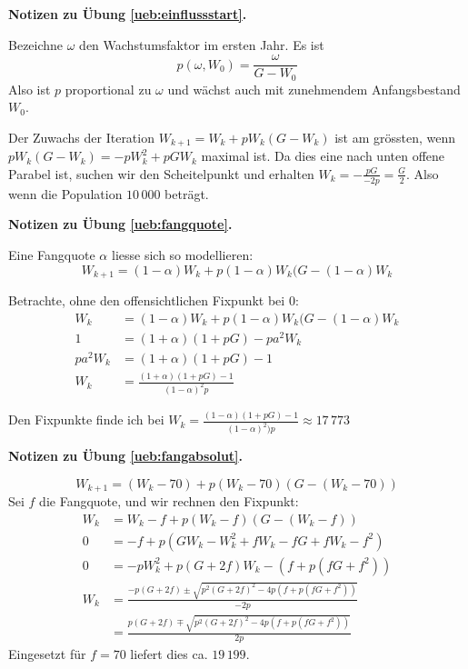 \documentclass[%
11pt,%
twoside,%
titlepage,%
german,%
headsepline%
]{scrartcl}
\newcommand{\concatueb}[1]{ueb:#1}%
\newcommand{\concatlsg}[1]{lsg:#1}%
\newenvironment{lsg}[1]{%
    \par\noindent\textbf{Notizen zu Übung \ref{\concatueb{#1}}.}%
    \label{\concatlsg{#1}}
}{%
    \par%
}
\begin{document}
\begin{lsg}{einflussstart}
    Bezeichne $\omega$ den Wachstumsfaktor im ersten Jahr. Es ist
    $$p(\omega,W_0)=\frac{\omega}{G-W_0}$$
    Also ist $p$ proportional zu $\omega$ und wächst auch mit zunehmendem Anfangsbestand $W_0$.

    Der Zuwachs der Iteration $W_{k+1} = W_k+pW_k(G-W_k)$ ist am grössten, wenn $pW_k(G-W_k)=-pW_k^2+pGW_k$ maximal ist. Da dies eine nach unten offene Parabel ist, suchen wir den Scheitelpunkt und erhalten $W_k=-\frac{pG}{-2p}=\frac{G}{2}$. Also wenn die Population $10\,000$ beträgt.
\end{lsg}
\begin{lsg}{fangquote}
    Eine Fangquote $\alpha$ liesse sich so modellieren:
    $$W_{k+1}=(1-\alpha)W_k+p(1-\alpha)W_k(G-(1-\alpha)W_k$$

    Betrachte, ohne den offensichtlichen Fixpunkt bei $0$:
    \begin{align*}
        W_{k} &= (1-\alpha)W_k+p(1-\alpha)W_k(G-(1-\alpha)W_k\\
        1 &= (1+\alpha)(1+pG)-pa^2W_k\\
        pa^2W_k &= (1+\alpha)(1+pG)-1\\
        W_k &= \frac{(1+\alpha)(1+pG)-1}{(1-\alpha)^2p}
    \end{align*}
    
    Den Fixpunkte finde ich bei $W_k=\frac{(1-\alpha)(1+pG)-1}{(1-\alpha)^2)p}\approx17\,773$
\end{lsg}

\begin{lsg}{fangabsolut}
    $$W_{k+1}=(W_k-70)+p(W_k-70)(G-(W_k-70))$$
 Sei $f$ die Fangquote, und wir rechnen den Fixpunkt:
    \begin{align*}
        W_{k} &= W_k-f+p(W_k-f)(G-(W_k-f))\\
        0 &= -f+p(GW_k-W_k^2+fW_k-fG+fW_k-f^2)\\
        0 &= -pW_k^2+p(G+2f)W_k-(f+p(fG+f^2))\\
        W_k &= \frac{-p(G+2f)\pm\sqrt{p^2(G+2f)^2-4p(f+p(fG+f^2))}}{-2p}\\
        &= \frac{p(G+2f)\mp\sqrt{p^2(G+2f)^2-4p(f+p(fG+f^2))}}{2p}
    \end{align*}
    Eingesetzt für $f=70$ liefert dies ca. $19\,199$.
\end{lsg}

\clearpage
\end{document}
